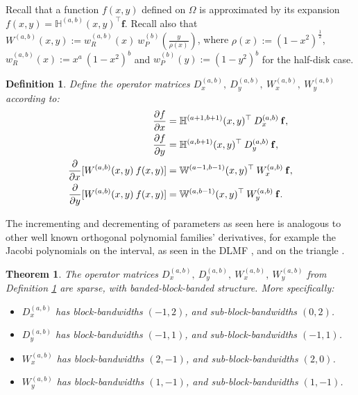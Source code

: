 \documentclass[11pt, oneside]{article}   	%
\newcommand{\half}{\frac{1}{2}}
\newcommand{\hdop}{H}
\newcommand{\bighdop}{\mathbb{\hdop}}
\newcommand{\Wab}{{W^{(a,b)}}}
\newcommand{\bighdopab}{\bighdop^{(a,b)}}
\newcommand{\genjac}{R}
\newcommand{\genjacw}{w_\genjac}
\newcommand{\jacw}{w_P}
\newcommand{\bigW}{\mathbb{W}}
\newtheorem{theorem}{Theorem}
\newtheorem{definition}{Definition}
\begin{document}
Recall that a function $f(x,y)$ defined on $\Omega$ is approximated by its expansion $f(x,y) = \bighdopab(x,y)^\top \mathbf{f}$. Recall also that $\Wab(x,y) := \genjacw^{(a,b)}(x) \: \jacw^{(b)}(\frac{y}{\rho(x)})$, where $\rho(x) := (1-x^2)^\half$, $\genjacw^{(a,b)}(x) := x^a \: (1-x^2)^b$ and $\jacw^{(b)}(y) := (1-y^2)^b$ for the half-disk case.

\begin{definition}\label{def:differentialoperators}
Define the operator matrices $D_x^{(a,b)}, \: D_y^{(a,b)}, \: W_x^{(a,b)}, \: W_y^{(a,b)}$ according to:
\begin{align*}
{\partial f \over \partial x}&= \bighdop^{(a+1,b+1)}(x,y)^\top \: D_x^{(a,b)} \: \mathbf{f}, \\
{\partial f \over \partial y} &= \bighdop^{(a,b+1)}(x,y)^\top \: D_y^{(a,b)} \: \mathbf{f}, \\
{\partial \over \partial x}[\Wab(x,y) \: f(x,y)] &= \bigW^{(a-1,b-1)}(x,y)^\top \: W_x^{(a,b)} \: \mathbf{f}, \\
{\partial \over \partial y}[\Wab(x,y) \: f(x,y)] &= \bigW^{(a,b-1)}(x,y)^\top \: W_y^{(a,b)} \: \mathbf{f}.
\end{align*}
\end{definition}

The incrementing and decrementing of parameters as seen here is analogous to other well known orthogonal polynomial families' derivatives, for example the Jacobi polynomials on the interval, as seen in the DLMF \cite[(18.9.3)]{DLMF}, and on the triangle \cite{olver2018recurrence}.

\begin{theorem}\label{theorem:sparsityofdifferentialoperators}
The operator matrices $D_x^{(a,b)}, \: D_y^{(a,b)}, \: W_x^{(a,b)}, \: W_y^{(a,b)}$ from Definition \ref{def:differentialoperators} are sparse, with banded-block-banded structure. More specifically:
\begin{itemize}
	\item $D_x^{(a,b)}$ has  block-bandwidths $(-1,2)$, and sub-block-bandwidths $(0, 2)$.
  	\item $D_y^{(a,b)}$ has  block-bandwidths $(-1,1)$, and sub-block-bandwidths $(-1,1)$.
	\item $W_x^{(a,b)}$ has  block-bandwidths $(2,-1)$, and sub-block-bandwidths $(2, 0)$.
  	\item $W_y^{(a,b)}$ has  block-bandwidths $(1,-1)$, and sub-block-bandwidths $(1,-1)$.
\end{itemize}
\end{theorem}
\end{document}
